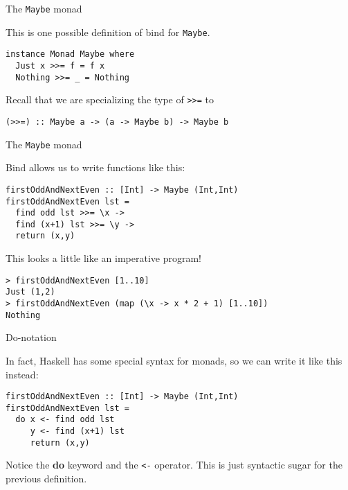 %
\begin{frame}[fragile]{The \texttt{Maybe} monad}

This is one possible definition of bind for \texttt{Maybe}.

\begin{block}{}
\begin{verbatim}
instance Monad Maybe where
  Just x >>= f = f x
  Nothing >>= _ = Nothing
\end{verbatim}
\end{block}

Recall that we are specializing the type of \texttt{>>=} to

\begin{block}{}
\begin{verbatim}
(>>=) :: Maybe a -> (a -> Maybe b) -> Maybe b
\end{verbatim}
\end{block}

\end{frame}

%
\begin{frame}[fragile]{The \texttt{Maybe} monad}

Bind allows us to write functions like this:

\begin{block}{}
\begin{verbatim}
firstOddAndNextEven :: [Int] -> Maybe (Int,Int)
firstOddAndNextEven lst = 
  find odd lst >>= \x ->
  find (x+1) lst >>= \y ->
  return (x,y)
\end{verbatim}
\end{block}

This looks a little like an imperative program!

\begin{block}{}
\begin{verbatim}
> firstOddAndNextEven [1..10]
Just (1,2)
> firstOddAndNextEven (map (\x -> x * 2 + 1) [1..10])
Nothing
\end{verbatim}
\end{block}

\end{frame}

%
\begin{frame}[fragile]{Do-notation}

In fact, Haskell has some special syntax for monads, so we can write it like
this instead:

\begin{block}{}
\begin{verbatim}
firstOddAndNextEven :: [Int] -> Maybe (Int,Int)
firstOddAndNextEven lst = 
  do x <- find odd lst
     y <- find (x+1) lst
     return (x,y)
\end{verbatim}
\end{block}

Notice the \textbf{do} keyword and the \texttt{<-} operator. This is just
syntactic sugar for the previous definition.

\end{frame}

